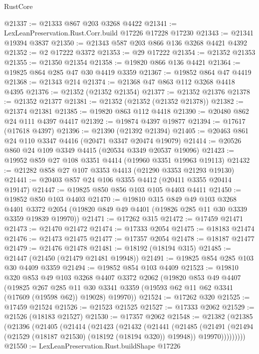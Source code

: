 \begin{lexlean}{RustCore}
\begin{coremodule}
@21337 := @21333 @867 @203 @3268 @4422
@21341 := LexLeanPreservation.Rust.Corr.build @17226 @17228 @17230
@21343 := @21341 @19394 @3837
@21350 := @21343 @587 @203 @866 @136 @3268 @4421 @4392
@21352 := @2 @17222 @3372
@21353 := @29 @17222
@21354 := @21352 @21353
@21355 := @21350 @21354
@21358 := @19820 @866 @136 @4421
@21364 := @19825 @864 @285 @47 @30 @4419 @3359
@21367 := @19852 @864 @47 @4419
@21368 := @21343 @214
@21374 := @21368 @47 @863 @112 @3268 @4418 @4395
@21376 := @21352 (@21352 @21354)
@21377 := @21352 @21376
@21378 := @21352 @21377
@21381 := @21352 (@21352 (@21352 @21378))
@21382 := @21374 @21381
@21385 := @19820 @863 @112 @4418
@21390 := @20480 @862 @24 @111 @4397 @4417
@21392 := @19874 @4397 @19877
@21394 := @17617 (@17618 @4397)
@21396 := @21390 (@21392 @21394)
@21405 := @20463 @861 @24 @110 @3347 @4416 (@20471 @3347 @20474 @19079)
@21414 := @20526 @860 @24 @109 @3349 @4415 (@20534 @3349 @20537 @19096)
@21423 := @19952 @859 @27 @108 @3351 @4414 (@19960 @3351 @19963 @19113)
@21432 := @21282 @858 @27 @107 @3353 @4413 (@21290 @3353 @21293 @19130)
@21441 := @20403 @857 @24 @106 @3355 @4412 (@20411 @3355 @20414 @19147)
@21447 := @19825 @850 @856 @103 @105 @4403 @4411
@21450 := @19852 @850 @103 @4403
@21470 := @19810
    @315
    @849
    @49
    @103
    @3268
    @4401
    @3372
    @2054
    (@19820 @849 @49 @4401 (@19826 @285 @11 @30 @3339 @3359 @19839 @19970))
@21471 := @17262 @315
@21472 := @17459 @21471
@21473 := @21470 @21472
@21474 := @17333 @2054
@21475 := @18183 @21474
@21476 := @21473 @21475
@21477 := @17357 @2054
@21478 := @18187 @21477
@21479 := @21476 @21478
@21481 := @18192 (@18194 @315)
@21485 := @21447 (@21450 (@21479 @21481 @19948))
@21491 := @19825 @854 @285 @103 @30 @4409 @3359
@21494 := @19852 @854 @103 @4409
@21523 := @19810
    @320
    @853
    @49
    @103
    @3268
    @4407
    @3372
    @2062
    (@19820
      @853
      @49
      @4407
      (@19825
        @267
        @285
        @11
        @30
        @3341
        @3359
        (@19593 @62 @11 @62 @3341 (@17609 (@19598 @62)) @19028)
        @19970))
@21524 := @17262 @320
@21525 := @17459 @21524
@21526 := @21523 @21525
@21527 := @17333 @2062
@21529 := @21526 (@18183 @21527)
@21530 := @17357 @2062
@21548 := @21382
    (@21385
      (@21396
        (@21405
          (@21414
            (@21423
              (@21432
                (@21441
                  (@21485
                    (@21491
                      (@21494 (@21529 (@18187 @21530) (@18192 (@18194 @320)) @19948))
                      @19970)))))))))
@21550 := LexLeanPreservation.Rust.buildShape @17226

\end{coremodule}
\end{lexlean}

